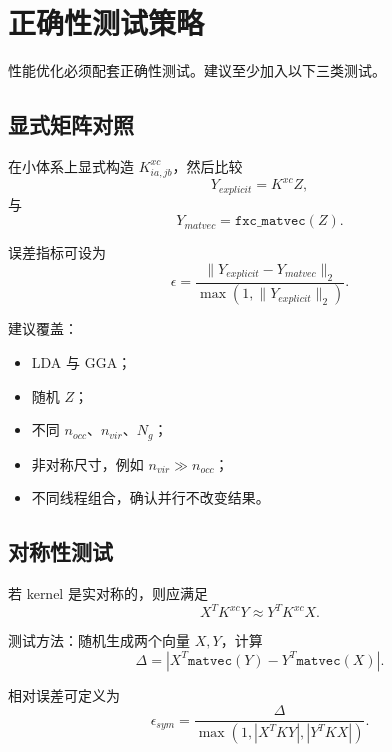 \documentclass[11pt,a4paper]{ctexart}
\begin{document}
\section{正确性测试策略}

性能优化必须配套正确性测试。建议至少加入以下三类测试。

\subsection{显式矩阵对照}

在小体系上显式构造 $K^{xc}_{ia,jb}$，然后比较
\begin{equation}
  Y_{explicit}=K^{xc}Z,
\end{equation}
与
\begin{equation}
  Y_{matvec}=\texttt{fxc\_matvec}(Z).
\end{equation}

误差指标可设为
\begin{equation}
  \epsilon=\frac{\|Y_{explicit}-Y_{matvec}\|_2}{\max(1,\|Y_{explicit}\|_2)}.
\end{equation}

建议覆盖：

\begin{itemize}[leftmargin=2em]
  \item LDA 与 GGA；
  \item 随机 $Z$；
  \item 不同 $n_{occ}$、$n_{vir}$、$N_g$；
  \item 非对称尺寸，例如 $n_{vir}\gg n_{occ}$；
  \item 不同线程组合，确认并行不改变结果。
\end{itemize}

\subsection{对称性测试}

若 kernel 是实对称的，则应满足
\begin{equation}
  X^T K^{xc}Y \approx Y^T K^{xc}X.
\end{equation}

测试方法：随机生成两个向量 $X,Y$，计算
\begin{equation}
  \Delta = \left|X^T\texttt{matvec}(Y)-Y^T\texttt{matvec}(X)\right|.
\end{equation}

相对误差可定义为
\begin{equation}
  \epsilon_{sym}=\frac{\Delta}{\max\left(1, |X^TKY|, |Y^TKX|\right)}.
\end{equation}
\end{document}
